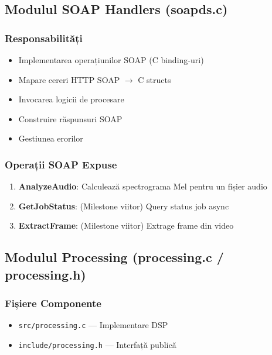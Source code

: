 \documentclass[12pt,a4paper,twoside]{article}
\begin{document}
\subsection{Modulul SOAP Handlers (soapds.c)}

\subsubsection{Responsabilități}

\begin{itemize}
    \item Implementarea operațiunilor SOAP (C binding-uri)
    \item Mapare cereri HTTP SOAP $\rightarrow$ C structs
    \item Invocarea logicii de procesare
    \item Construire răspunsuri SOAP
    \item Gestiunea erorilor
\end{itemize}

\subsubsection{Operații SOAP Expuse}

\begin{enumerate}
    \item \textbf{AnalyzeAudio}: Calculează spectrograma Mel pentru un fișier audio
    \item \textbf{GetJobStatus}: (Milestone viitor) Query status job async
    \item \textbf{ExtractFrame}: (Milestone viitor) Extrage frame din video
\end{enumerate}

\subsection{Modulul Processing (processing.c / processing.h)}

\subsubsection{Fișiere Componente}
\begin{itemize}
    \item \texttt{src/processing.c} --- Implementare DSP
    \item \texttt{include/processing.h} --- Interfață publică
\end{itemize}
\end{document}
